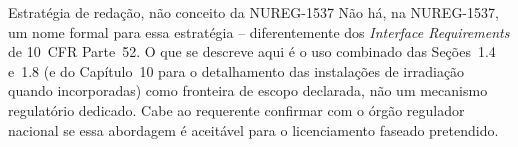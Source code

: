 \begin{notaregulatoria}{Estrat\'egia de redação, n\~ao conceito da NUREG-1537}
N\~ao h\'a, na NUREG-1537, um nome formal para essa estrat\'egia --
diferentemente dos \emph{Interface Requirements} de 10~CFR Parte~52. O
que se descreve aqui \'e o uso combinado das Se\c{c}\~oes~1.4 e~1.8 (e do
Cap\'itulo~10 para o detalhamento das instala\c{c}\~oes de
irradia\c{c}\~ao quando incorporadas) como fronteira de escopo declarada,
n\~ao um mecanismo regulat\'orio dedicado. Cabe ao requerente confirmar
com o \'org\~ao regulador nacional se essa abordagem \'e aceit\'avel para
o licenciamento faseado pretendido.
\end{notaregulatoria}
